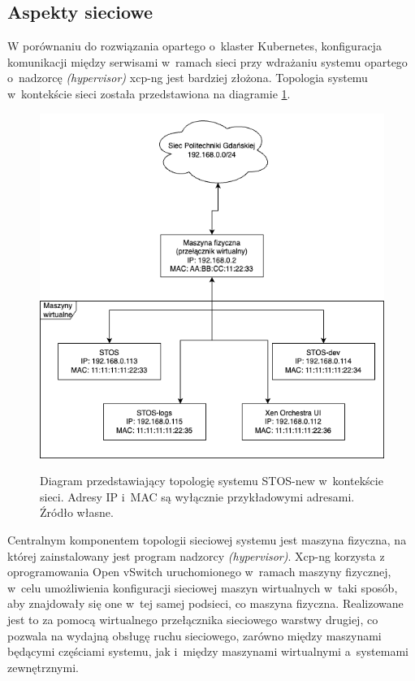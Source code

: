 \subsection{Aspekty sieciowe}
W porównaniu do rozwiązania opartego o~klaster Kubernetes, konfiguracja komunikacji między serwisami w~ramach sieci przy wdrażaniu systemu opartego o~nadzorcę \textit{(hypervisor)} xcp-ng jest bardziej złożona. Topologia systemu w~kontekście sieci została przedstawiona na diagramie \ref{diagramSiecStos}.
\begin{figure}[!h]
	\begin{center}
		\resizebox{0.7\textwidth}{!} {
			\includegraphics{img/4/wdrozeniesiec.png}
		}
		\caption[Topologia sieciowa wdrożonego systemu STOS-new]{Diagram przedstawiający topologię systemu STOS-new w~kontekście sieci. Adresy IP i~MAC są wyłącznie przykładowymi adresami. Źródło własne.}
		\label{diagramSiecStos}
	\end{center}
\end{figure}
\noindent Centralnym komponentem topologii sieciowej systemu jest maszyna fizyczna, na której zainstalowany jest program nadzorcy \textit{(hypervisor)}. Xcp-ng korzysta z oprogramowania Open vSwitch uruchomionego w~ramach maszyny fizycznej, w~celu umożliwienia konfiguracji sieciowej maszyn wirtualnych w~taki sposób, aby znajdowały się one w~tej samej podsieci, co maszyna fizyczna\cite{xcpNetwork}. Realizowane jest to za pomocą wirtualnego przełącznika sieciowego warstwy drugiej, co pozwala na wydajną obsługę ruchu sieciowego, zarówno między maszynami będącymi częściami systemu, jak i~między maszynami wirtualnymi a~systemami zewnętrznymi\cite{vswitch}.
